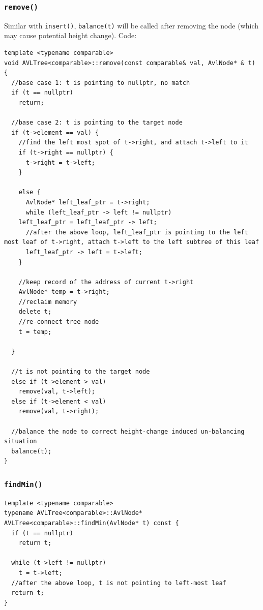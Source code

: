 \documentclass[11pt]{book}
\begin{document}
\subsubsection{\texttt{remove()}}
\label{sec:orgea98de3}
Similar with \texttt{insert()}, \texttt{balance(t)} will be called after removing the node (which may cause potential height change). Code:
\begin{verbatim}
template <typename comparable>
void AVLTree<comparable>::remove(const comparable& val, AvlNode* & t) {
  //base case 1: t is pointing to nullptr, no match
  if (t == nullptr)
    return;

  //base case 2: t is pointing to the target node
  if (t->element == val) {
    //find the left most spot of t->right, and attach t->left to it
    if (t->right == nullptr) {
      t->right = t->left;
    }

    else {
      AvlNode* left_leaf_ptr = t->right;
      while (left_leaf_ptr -> left != nullptr)
	left_leaf_ptr = left_leaf_ptr -> left;
      //after the above loop, left_leaf_ptr is pointing to the left most leaf of t->right, attach t->left to the left subtree of this leaf
      left_leaf_ptr -> left = t->left;
    }

    //keep record of the address of current t->right
    AvlNode* temp = t->right;
    //reclaim memory 
    delete t;
    //re-connect tree node 
    t = temp;

  }

  //t is not pointing to the target node
  else if (t->element > val) 
    remove(val, t->left);
  else if (t->element < val)
    remove(val, t->right);

  //balance the node to correct height-change induced un-balancing situation
  balance(t);  
}
\end{verbatim}
\subsubsection{\texttt{findMin()}}
\label{sec:orgdb72e37}
\begin{verbatim}
template <typename comparable>
typename AVLTree<comparable>::AvlNode* AVLTree<comparable>::findMin(AvlNode* t) const {
  if (t == nullptr)
    return t;

  while (t->left != nullptr)
    t = t->left;
  //after the above loop, t is not pointing to left-most leaf
  return t;  
}
\end{verbatim}
\end{document}
